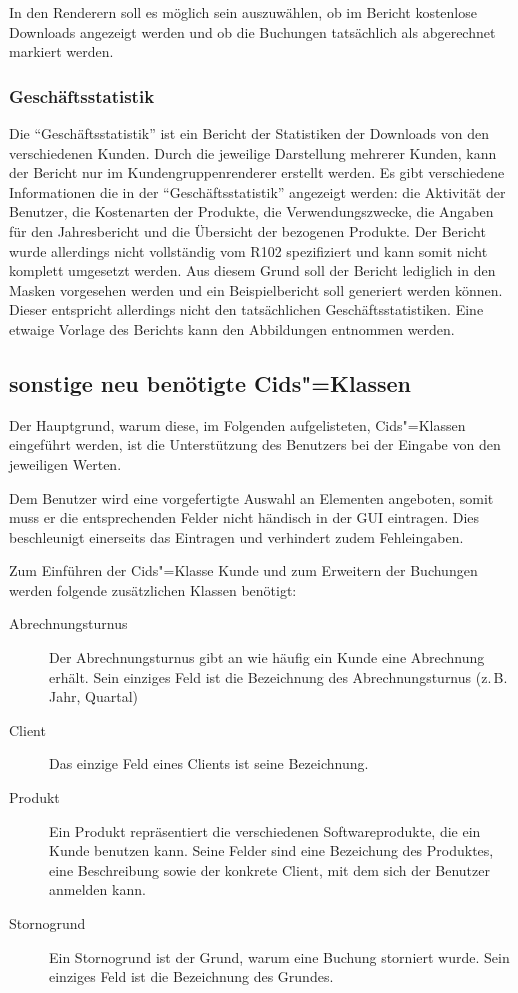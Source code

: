 In den Renderern soll es möglich sein auszuwählen, ob im Bericht kostenlose Downloads angezeigt werden und ob die Buchungen tatsächlich als abgerechnet markiert werden.

\subsubsection{Geschäftsstatistik}
Die \enquote{Geschäftsstatistik} ist ein Bericht der Statistiken der Downloads von den verschiedenen Kunden.
Durch die jeweilige Darstellung mehrerer Kunden, kann der Bericht nur im Kundengruppenrenderer erstellt werden.
Es gibt verschiedene Informationen die in der \enquote{Geschäftsstatistik} angezeigt werden: die Aktivität der Benutzer, die Kostenarten der Produkte, die Verwendungszwecke, die Angaben für den Jahresbericht und die Übersicht der bezogenen Produkte.
Der Bericht wurde allerdings nicht vollständig vom R102 spezifiziert und kann somit nicht komplett umgesetzt werden.
Aus diesem Grund soll der Bericht lediglich in den Masken vorgesehen werden und ein Beispielbericht soll generiert werden können. Dieser entspricht allerdings nicht den tatsächlichen Geschäftsstatistiken.
Eine etwaige Vorlage des Berichts kann den Abbildungen  entnommen werden.
 
\subsection{sonstige neu benötigte Cids"=Klassen} \label{subsec:neue_klassen}
Der Hauptgrund, warum diese, im Folgenden aufgelisteten, Cids"=Klassen eingeführt werden, ist die Unterstützung des Benutzers bei der Eingabe von den jeweiligen Werten.

Dem Benutzer wird eine vorgefertigte Auswahl an Elementen angeboten, somit muss er die entsprechenden Felder nicht händisch in der GUI eintragen.
Dies beschleunigt einerseits das Eintragen und verhindert zudem Fehleingaben. 

Zum Einführen der Cids"=Klasse Kunde und zum Erweitern der Buchungen werden folgende zusätzlichen Klassen benötigt:
\begin{description}
\item[Abrechnungsturnus] Der Abrechnungsturnus gibt an wie häufig ein Kunde eine Abrechnung erhält. Sein einziges Feld ist die Bezeichnung des Abrechnungsturnus (z.\,B. Jahr, Quartal)
\item[Client] Das einzige Feld eines Clients ist seine Bezeichnung.
\item[Produkt] Ein Produkt repräsentiert die verschiedenen Softwareprodukte, die ein Kunde benutzen kann. Seine Felder sind eine Bezeichung des Produktes, eine Beschreibung sowie der konkrete Client, mit dem sich der Benutzer anmelden kann.
\item[Stornogrund] Ein Stornogrund ist der Grund, warum eine Buchung storniert wurde. Sein einziges Feld ist die Bezeichnung des Grundes.
\end{description}

